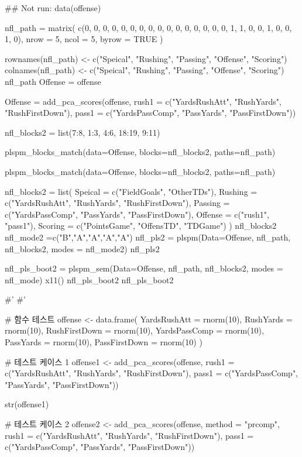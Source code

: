 \documentclass[a4paper]{book}
\begin{document}
\begin{Examples}
\begin{ExampleCode}

## Not run: 
data(offense)

nfl_path = matrix(
  c(0, 0, 0, 0, 0,
    0, 0, 0, 0, 0,
    0, 0, 0, 0, 0,
    0, 1, 1, 0, 0,
    1, 0, 0, 1, 0),
  nrow = 5, ncol = 5, byrow = TRUE )

rownames(nfl_path) <- c("Speical", "Rushing", "Passing", "Offense", "Scoring")
colnames(nfl_path) <- c("Speical", "Rushing", "Passing", "Offense", "Scoring")
nfl_path
Offense = offense %

Offense =  add_pca_scores(offense,
               rush1 = c("YardsRushAtt", "RushYards", "RushFirstDown"),
               pass1 = c("YardsPassComp", "PassYards", "PassFirstDown"))


nfl_blocks2 = list(7:8, 1:3, 4:6,  18:19, 9:11)

plspm_blocks_match(data=Offense, blocks=nfl_blocks2,
                   paths=nfl_path)

plspm_blocks_match(data=Offense, blocks=nfl_blocks2,
                   paths=nfl_path)%

nfl_blocks2 = list(
  Speical = c("FieldGoals", "OtherTDs"),
  Rushing = c("YardsRushAtt", "RushYards", "RushFirstDown"),
  Passing = c("YardsPassComp", "PassYards", "PassFirstDown"),
  Offense = c("rush1", "pass1"),
  Scoring = c("PointsGame", "OffensTD", "TDGame")
)
nfl_blocks2
nfl_mode2 =c("B","A","A","A","A")
nfl_pls2 = plspm(Data=Offense, nfl_path, nfl_blocks2, modes = nfl_mode2)
nfl_pls2%

nfl_pls_boot2 = plspm_sem(Data=Offense, nfl_path, nfl_blocks2, modes = nfl_mode)
x11()
nfl_pls_boot2 %
nfl_pls_boot2 %

#'
#'

# 함수 테스트
offense <- data.frame(
  YardsRushAtt = rnorm(10),
  RushYards = rnorm(10),
  RushFirstDown = rnorm(10),
  YardsPassComp = rnorm(10),
  PassYards = rnorm(10),
  PassFirstDown = rnorm(10)
)

# 테스트 케이스 1
offense1 <- add_pca_scores(offense,
                           rush1 = c("YardsRushAtt", "RushYards", "RushFirstDown"),
                           pass1 = c("YardsPassComp", "PassYards", "PassFirstDown"))

str(offense1)

# 테스트 케이스 2
offense2 <- add_pca_scores(offense, method = "prcomp",
                           rush1 = c("YardsRushAtt", "RushYards", "RushFirstDown"),
                           pass1 = c("YardsPassComp", "PassYards", "PassFirstDown"))


\end{ExampleCode}
\end{Examples}
\end{document}
